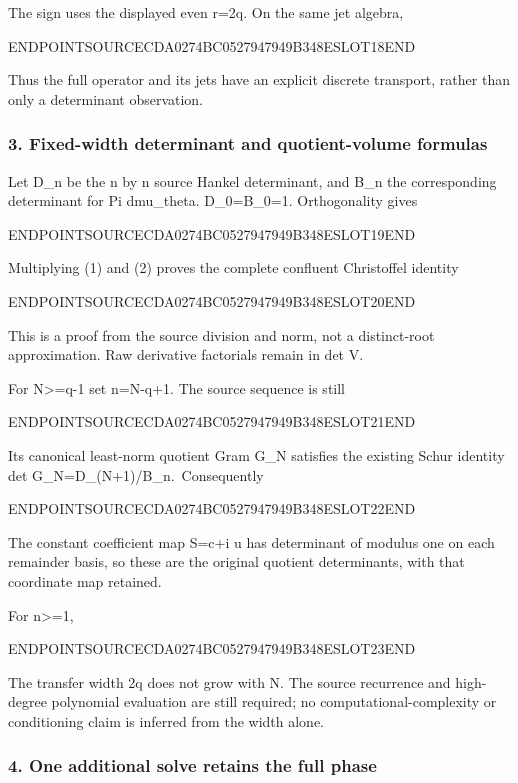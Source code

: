 The sign uses the displayed even r=2q. On the same jet algebra,

ENDPOINTSOURCECDA0274BC0527947949B348ESLOT18END

Thus the full operator and its jets have an explicit discrete transport, rather than only a determinant observation.

\subsubsection{3. Fixed-width determinant and quotient-volume formulas}\label{endpoint-pr24_original--fixed-width-determinant-and-quotient-volume-formulas}

Let D\_n be the n by n source Hankel determinant, and B\_n the corresponding determinant for Pi dmu\_theta. D\_0=B\_0=1. Orthogonality gives

ENDPOINTSOURCECDA0274BC0527947949B348ESLOT19END

Multiplying (1) and (2) proves the complete confluent Christoffel identity

ENDPOINTSOURCECDA0274BC0527947949B348ESLOT20END

This is a proof from the source division and norm, not a distinct-root approximation. Raw derivative factorials remain in det V.

For N\textgreater=q-1 set n=N-q+1. The source sequence is still

ENDPOINTSOURCECDA0274BC0527947949B348ESLOT21END

Its canonical least-norm quotient Gram G\_N satisfies the existing Schur identity det G\_N=D\_(N+1)/B\_n.~Consequently

ENDPOINTSOURCECDA0274BC0527947949B348ESLOT22END

The constant coefficient map S=c+i u has determinant of modulus one on each remainder basis, so these are the original quotient determinants, with that coordinate map retained.

For n\textgreater=1,

ENDPOINTSOURCECDA0274BC0527947949B348ESLOT23END

The transfer width 2q does not grow with N. The source recurrence and high-degree polynomial evaluation are still required; no computational-complexity or conditioning claim is inferred from the width alone.

\subsubsection{4. One additional solve retains the full phase}\label{endpoint-pr24_original--one-additional-solve-retains-the-full-phase}

